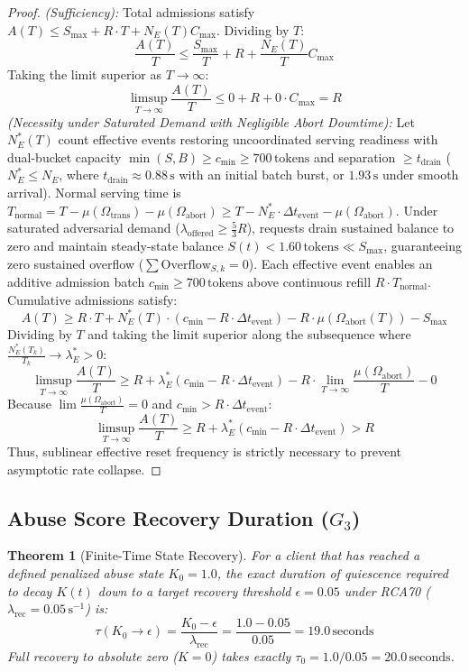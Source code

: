 \documentclass[conference]{IEEEtran}
\newtheorem{theorem}{Theorem}
\begin{document}
\begin{proof}
\textit{(Sufficiency):} Total admissions satisfy $A(T) \le S_{\max} + R \cdot T + N_E(T) C_{\max}$. Dividing by $T$:
$$\frac{A(T)}{T} \le \frac{S_{\max}}{T} + R + \frac{N_E(T)}{T} C_{\max}$$
Taking the limit superior as $T \to \infty$:
$$\limsup_{T\to\infty} \frac{A(T)}{T} \le 0 + R + 0 \cdot C_{\max} = R$$
\textit{(Necessity under Saturated Demand with Negligible Abort Downtime):} Let $N_E^*(T)$ count effective events restoring uncoordinated serving readiness with dual-bucket capacity $\min(S, B) \ge c_{\min} \ge 700\,\text{tokens}$ and separation $\ge t_{\text{drain}}$ ($N_E^* \le N_E$, where $t_{\text{drain}} \approx 0.88\,\text{s}$ with an initial batch burst, or $1.93\,\text{s}$ under smooth arrival). Normal serving time is $T_{\text{normal}} = T - \mu(\Omega_{\text{trans}}) - \mu(\Omega_{\text{abort}}) \ge T - N_E^* \cdot \Delta t_{\text{event}} - \mu(\Omega_{\text{abort}})$. Under saturated adversarial demand ($\lambda_{\text{offered}} \ge \frac{5}{3} R$), requests drain sustained balance to zero and maintain steady-state balance $S(t) < 1.60\,\text{tokens} \ll S_{\max}$, guaranteeing zero sustained overflow ($\sum \text{Overflow}_{S, k} = 0$). Each effective event enables an additive admission batch $c_{\min} \ge 700\,\text{tokens}$ above continuous refill $R \cdot T_{\text{normal}}$. Cumulative admissions satisfy:
$$A(T) \ge R \cdot T + N_E^*(T) \cdot (c_{\min} - R \cdot \Delta t_{\text{event}}) - R \cdot \mu(\Omega_{\text{abort}}(T)) - S_{\max}$$
Dividing by $T$ and taking the limit superior along the subsequence where $\frac{N_E^*(T_k)}{T_k} \to \lambda_E^* > 0$:
$$\limsup_{T\to\infty} \frac{A(T)}{T} \ge R + \lambda_E^*(c_{\min} - R \cdot \Delta t_{\text{event}}) - R \cdot \lim_{T\to\infty}\frac{\mu(\Omega_{\text{abort}})}{T} - 0$$
Because $\lim \frac{\mu(\Omega_{\text{abort}})}{T} = 0$ and $c_{\min} > R \cdot \Delta t_{\text{event}}$:
$$\limsup_{T\to\infty} \frac{A(T)}{T} \ge R + \lambda_E^*(c_{\min} - R \cdot \Delta t_{\text{event}}) > R$$
Thus, sublinear effective reset frequency is strictly necessary to prevent asymptotic rate collapse.
\end{proof}

\subsection{Abuse Score Recovery Duration ($G_3$)}
\begin{theorem}[Finite-Time State Recovery]
For a client that has reached a defined penalized abuse state $K_0 = 1.0$, the exact duration of quiescence required to decay $K(t)$ down to a target recovery threshold $\epsilon = 0.05$ under RCA70 ($\lambda_{\text{rec}} = 0.05\,\text{s}^{-1}$) is:
\begin{equation}
\tau(K_0 \to \epsilon) = \frac{K_0 - \epsilon}{\lambda_{\text{rec}}} = \frac{1.0 - 0.05}{0.05} = 19.0\,\text{seconds}
\end{equation}
Full recovery to absolute zero ($K=0$) takes exactly $\tau_0 = 1.0 / 0.05 = 20.0\,\text{seconds}$.
\end{theorem}
\end{document}

